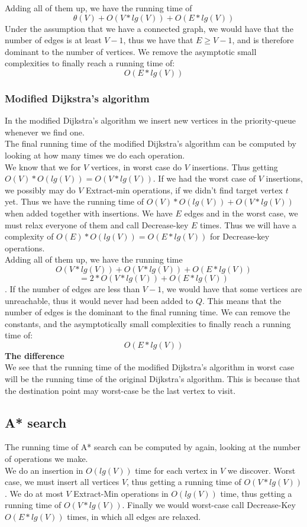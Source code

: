 \documentclass[11pt]{article}
\begin{document}
\noindent Adding all of them up, we have the running time of $$\theta(V) + O(V*lg(V)) + O(E*lg(V))$$
\newpage
\noindent Under the assumption that we have a connected graph, we would have that the number of edges is at least $V-1$, thus we have that $E \geq V-1$, and is therefore dominant to the number of vertices.  We remove the asymptotic small complexities to finally reach a running time of:
$$O(E*lg(V))$$

\subsubsection{Modified Dijkstra's algorithm}
In the modified Dijkstra's algorithm we insert new vertices in the priority-queue whenever we find one.\\
The final running time of the modified Dijkstra's algorithm can be computed by looking at how many times we do each operation.\\
We know that we for $V$ vertices, in worst case do $V$ insertions. Thus getting $O(V) * O(lg(V)) = O(V*lg(V))$. If we had the worst case of $V$ insertions, we possibly may do $V$ Extract-min operations, if we didn't find target vertex $t$ yet. Thus we have the running time of $O(V) * O(lg(V)) + O(V*lg(V))$ when added together with insertions. We have $E$ edges and in the worst case, we must relax everyone of them and call Decrease-key $E$ times. Thus we will have a complexity of $O(E) * O(lg(V)) = O(E*lg(V))$ for Decrease-key operations.\\

\noindent Adding all of them up, we have the running time $$O(V*lg(V)) + O(V*lg(V)) + O(E*lg(V))$$ $$= 2*O(V*lg(V)) + O(E*lg(V))$$.
If the number of edges are less than $V-1$, we would have that some vertices are unreachable, thus it would never had been added to $Q$. This means that the number of edges is the dominant to the final running time. We can remove the constants, and the asymptotically small complexities to finally reach a running time of:
$$O(E*lg(V))$$
\textbf{The difference}\\
We see that the running time of the modified Dijkstra's algorithm in worst case will be the running time of the original Dijkstra's algorithm. This is because that the destination point may worst-case be the last vertex to visit.\\
\subsection{A* search}
The running time of A* search can be computed by again, looking at the number of operations we make.\\
We do an insertion in $O(lg(V))$ time for each vertex in $V$ we discover. Worst case, we must insert all vertices $V$, thus getting a running time of $O(V*lg(V))$. We do at most $V$ Extract-Min operations in $O(lg(V))$ time, thus getting a running time of $O(V*lg(V))$. Finally we would worst-case call Decrease-Key $O(E*lg(V))$ times, in which all edges are relaxed.\\
\end{document}
